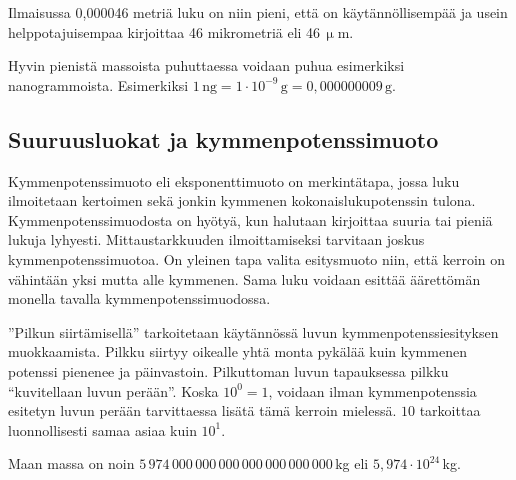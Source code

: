 \begin{esimerkki}
Ilmaisussa 0,000046 metriä luku on niin pieni, että on käytännöllisempää ja usein helppotajuisempaa kirjoittaa 46 mikrometriä eli 46\,$\upmu$m.
\end{esimerkki}

\begin{esimerkki}
Hyvin pienistä massoista puhuttaessa voidaan puhua esimerkiksi nanogrammoista. Esimerkiksi $1\,\textrm{ng} = 1 \cdot 10^{-9}\,\textrm{g} = 0,000000009\,\textrm{g} $.
\end{esimerkki}


\subsection*{Suuruusluokat ja kymmenpotenssimuoto}

Kymmenpotenssimuoto eli eksponenttimuoto on merkintätapa, jossa luku ilmoitetaan kertoimen sekä jonkin kymmenen kokonaislukupotenssin tulona. Kymmenpotenssimuodosta on hyötyä, kun halutaan kirjoittaa suuria tai pieniä lukuja lyhyesti. Mittaustarkkuuden ilmoittamiseksi tarvitaan joskus kymmenpotenssimuotoa. On yleinen tapa valita esitysmuoto niin, että kerroin on vähintään yksi mutta alle kymmenen. Sama luku voidaan esittää äärettömän monella tavalla kymmenpotenssimuodossa. 

”Pilkun siirtämisellä” tarkoitetaan käytännössä luvun kymmenpotenssiesityksen muokkaamista. Pilkku siirtyy oikealle yhtä monta pykälää kuin kymmenen potenssi pienenee ja päinvastoin. Pilkuttoman luvun tapauksessa pilkku ``kuvitellaan luvun perään''. Koska $10^0 = 1$, voidaan ilman kymmenpotenssia esitetyn luvun perään tarvittaessa lisätä tämä kerroin mielessä. $10$ tarkoittaa luonnollisesti samaa asiaa kuin $10^1$. 

\begin{esimerkki}
Maan massa on noin $5\,974\,000\,000\,000\,000\,000\,000\,000$\,kg  eli $5,974\cdot10^{24}$\,kg.
\end{esimerkki}

